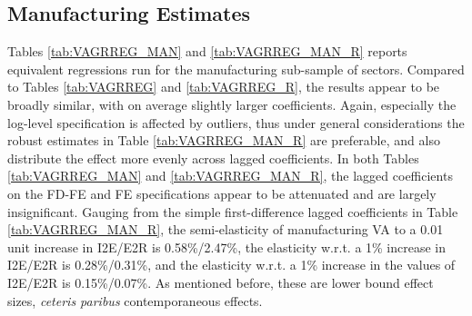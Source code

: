 \documentclass[a4paper]{article}
\begin{document}
\subsection{Manufacturing Estimates}

Tables \ref{tab:VAGRREG_MAN} and \ref{tab:VAGRREG_MAN_R} reports equivalent regressions run for the manufacturing sub-sample of sectors. Compared to Tables \ref{tab:VAGRREG} and \ref{tab:VAGRREG_R}, the results appear to be broadly similar, with on average slightly larger coefficients. Again, especially the log-level specification is affected by outliers, thus under general considerations the robust estimates in Table \ref{tab:VAGRREG_MAN_R} are preferable, and also distribute the effect more evenly across lagged coefficients. In both Tables \ref{tab:VAGRREG_MAN} and \ref{tab:VAGRREG_MAN_R}, the lagged coefficients on the FD-FE and FE specifications appear to be attenuated and are largely insignificant. Gauging from the simple first-difference lagged coefficients in Table \ref{tab:VAGRREG_MAN_R}, the semi-elasticity of manufacturing VA to a 0.01 unit increase in I2E/E2R is 0.58\%/2.47\%, the elasticity w.r.t. a 1\% increase in I2E/E2R is 0.28\%/0.31\%, and the elasticity w.r.t. a 1\% increase in the values of I2E/E2R is 0.15\%/0.07\%. As mentioned before, these are lower bound effect sizes, \textit{ceteris paribus} contemporaneous effects. %
\end{document}
